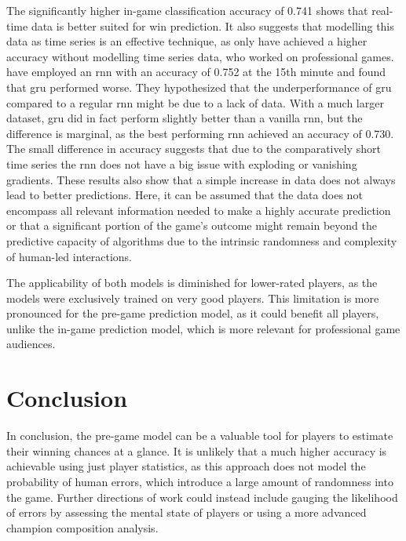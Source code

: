 \documentclass[12pt, a4paper, headinclude, twoside, plainheadsepline, open=right, numbers=noenddot, hidelinks, toc=listof, toc=bibliography]{scrreprt}
\begin{document}
The significantly higher in-game classification accuracy of 0.741 shows that real-time data is better suited for win prediction.
It also suggests that modelling this data as time series is an effective technique, as only \citeauthor{baileyStatisticalLearningEsports} \cite{baileyStatisticalLearningEsports} have achieved a higher accuracy without modelling time series data, who worked on professional games.
 \cite{silvaContinuousOutcomePrediction2018} have employed an \ac{rnn} with an accuracy of 0.752 at the 15th minute and found that \ac{gru} performed worse. 
They hypothesized that the underperformance of \ac{gru} compared to a regular \ac{rnn} might be due to a lack of data.
With a much larger dataset, \ac{gru} did in fact perform slightly better than a vanilla \ac{rnn}, but the difference is marginal, as the best performing \ac{rnn} achieved an accuracy of 0.730.
The small difference in accuracy suggests that due to the comparatively short time series the \ac{rnn} does not have a big issue with exploding or vanishing gradients.
These results also show that a simple increase in data does not always lead to better predictions.
Here, it can be assumed that the data does not encompass all relevant information needed to make a highly accurate prediction or that a significant portion of the game's outcome might remain beyond the predictive capacity of algorithms due to the intrinsic randomness and complexity of human-led interactions.

The applicability of both models is diminished for lower-rated players, as the models were exclusively trained on very good players.
This limitation is more pronounced for the pre-game prediction model, as it could benefit all players, unlike the in-game prediction model, which is more relevant for professional game audiences.


\chapter{Conclusion}
\label{chap:conclusion}
In conclusion, the pre-game model can be a valuable tool for players to estimate their winning chances at a glance.
It is unlikely that a much higher accuracy is achievable using just player statistics, as this approach does not model the probability of human errors, which introduce a large amount of randomness into the game.
Further directions of work could instead include gauging the likelihood of errors by assessing the mental state of players or using a more advanced champion composition analysis.
\end{document}
